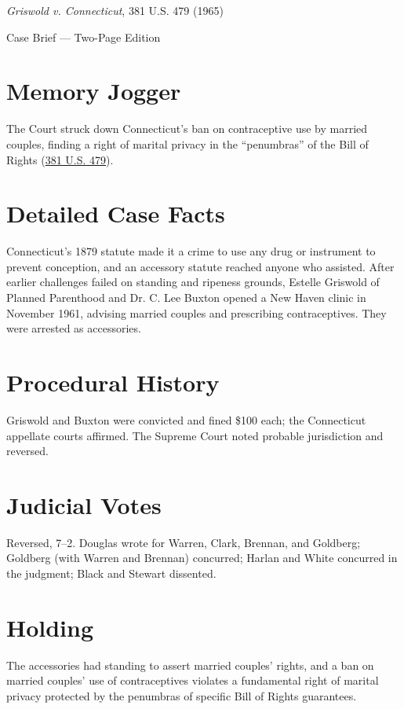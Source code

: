 \documentclass[12pt]{article}
\begin{document}
\begin{center}
{\LARGE \textit{Griswold v. Connecticut}, 381 U.S. 479 (1965)\par}
\vspace{0.5em}
{\large Case Brief --- Two-Page Edition\par}
\end{center}

\section{Memory Jogger}
The Court struck down Connecticut's ban on contraceptive use by married couples, finding a right of marital privacy in the ``penumbras'' of the Bill of Rights (\href{https://supreme.justia.com/cases/federal/us/381/479/}{381 U.S. 479}).

\section{Detailed Case Facts}
Connecticut's 1879 statute made it a crime to use any drug or instrument to prevent conception, and an accessory statute reached anyone who assisted. After earlier challenges failed on standing and ripeness grounds, Estelle Griswold of Planned Parenthood and Dr. C. Lee Buxton opened a New Haven clinic in November 1961, advising married couples and prescribing contraceptives. They were arrested as accessories.

\section{Procedural History}
Griswold and Buxton were convicted and fined \$100 each; the Connecticut appellate courts affirmed. The Supreme Court noted probable jurisdiction and reversed.

\section{Judicial Votes}
Reversed, 7--2. Douglas wrote for Warren, Clark, Brennan, and Goldberg; Goldberg (with Warren and Brennan) concurred; Harlan and White concurred in the judgment; Black and Stewart dissented.

\section{Holding}
The accessories had standing to assert married couples' rights, and a ban on married couples' use of contraceptives violates a fundamental right of marital privacy protected by the penumbras of specific Bill of Rights guarantees.
\end{document}
